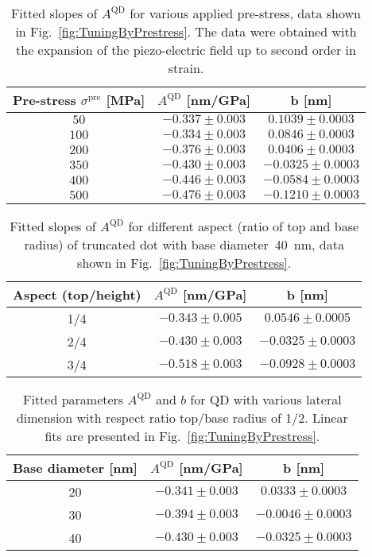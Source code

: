  		\begin{table}[ht!]
 			\centering
 			\caption{Fitted slopes of $A^{\mathrm{QD}}$ for various applied pre-stress, data shown in Fig.~\ref{fig:TuningByPrestress}. The data were obtained with the expansion of the piezo-electric field up to second order in strain.}
 			\label{tab:prestress_slopes}
 			\begin{tabular}{|c|c|c|}
 				\hline
 				Pre-stress $\sigma^\mathrm{pre}$ [MPa]		& $A^{\mathrm{QD}}$ [nm/GPa]    & b   [nm]    \\ \hline
 				$50$  &$-0.337 \pm 0.003$  & $0.1039 \pm 0.0003 $    \\ \hline
 				$100$	&$-0.334 \pm 0.003$  & $0.0846 \pm 0.0003 $     \\ \hline
 				$200$  &$-0.376 \pm 0.003$  & $0.0406\pm 0.0003 $    \\ \hline
 				$350$	&$-0.430 \pm 0.003$  & $-0.0325 \pm 0.0003$      \\ \hline
 				$400$  &$-0.446 \pm 0.003$  & $-0.0584 \pm 0.0003$    \\ \hline
 				$500$	&$-0.476 \pm 0.003$  & $-0.1210 \pm 0.0003$      \\ \hline
 			\end{tabular}    
 		\end{table}
 		
 		
 		
 		\begin{table}[ht!]
 			\centering
 			\caption{Fitted slopes of $A^{\mathrm{QD}}$ for different aspect (ratio of top and base radius) of truncated dot with base diameter~40~nm, data shown in Fig.~\ref{fig:TuningByPrestress}.}
 			\label{tab:aspect_slopes}
 			\begin{tabular}{|c|c|c|}
 				\hline
 				Aspect (top/height) 	& $A^{\mathrm{QD}}$ [nm/GPa]    & b   [nm]    \\ \hline
 				1/4	&$-0.343\pm0.005$ &	$0.0546	\pm	0.0005$\\ \hline
 				2/4	&$-0.430\pm0.003$ &	$-0.0325 \pm		0.0003$\\ \hline
 				3/4	&$-0.518\pm0.003$ &	$-0.0928	\pm 0.0003$\\ \hline
 			\end{tabular}    
 		\end{table}
 		
 		\begin{table}[ht!]
 			\centering
 			\caption{Fitted parameters $A^{\mathrm{QD}}$ and $b$ for QD with various lateral dimension with respect ratio top/base radius of 1/2. Linear fits are presented in Fig.~\ref{fig:TuningByPrestress}.}
 			\label{tab:lateral_slopes}
 			\begin{tabular}{|c|c|c|}
 				\hline
 				Base diameter [nm]	& $A^{\mathrm{QD}}$ [nm/GPa]    & b   [nm]    \\ \hline
			20&	$-0.341\pm0.003$&	$0.0333\pm		0.0003$\\ \hline
			30&	$-0.394\pm0.003$&	$-0.0046\pm	0.0003$\\ \hline
			40&	$-0.430\pm0.003$&	$-0.0325	\pm	0.0003$ \\ \hline
 			\end{tabular}    
 		\end{table}
 		
